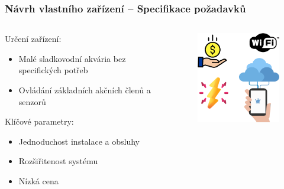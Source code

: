 \documentclass[%
  12pt,       				%
	t,                  %
	aspectratio=1610,   %
	unicode,						%
]{beamer}				    	%
\begin{document}
\begin{frame}[fragile]
\begin{columns}[T]
\begin{column}{0.5\textwidth}
\begin{figure}
			\end{figure}
		\end{column}
	\end{columns}											%
\end{frame}


\begin{frame}[fragile]
	\frametitle{Návrh vlastního zařízení -- Specifikace požadavků}
	
	\begin{columns}[T] 								%
		\begin{column}{0.8\textwidth}		%
			Určení zařízení:\\[1ex]
			\begin{itemize}
				\item Malé sladkovodní akvária bez specifických potřeb
				\item Ovládání základních akčních členů a senzorů
			\end{itemize}
			\vspace{1.5ex}%
			Klíčové parametry:\\[1ex]
			\begin{itemize}
				\item Jednoduchost instalace a obsluhy
				\item Rozšiřitenost systému
				\item Nízká cena
			\end{itemize}
		\end{column}
		\begin{column}{0.2\textwidth}		%
			\begin{figure}%
				\centering
				\vspace{2cm}	              %
				\hspace{-4cm}
				\includegraphics[width=5cm]{obrazky/prezentace/icons.png}
			\end{figure}
		\end{column}
	\end{columns}											%
\end{frame}
\end{document}
